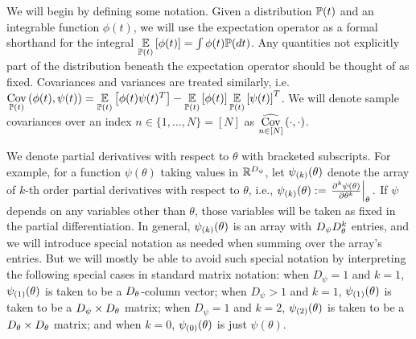 We will begin by defining some notation. Given a distribution $\mathbb{P}(t)$ and an
integrable function $\phi(t)$, we will use the expectation operator as a formal
shorthand for the integral
%
$\underset{\mathbb{P}(t)}{\mathbb{E}}\left[\phi(t)\right] = \int \phi(t) \mathbb{P}(dt)$.
%
Any quantities not explicitly part of the distribution beneath the expectation
operator should be thought of as fixed. Covariances and variances are treated
similarly, i.e.\,
%
%
$\underset{\mathbb{P}(t)}{\mathrm{Cov}}\left(\phi(t), \psi(t)\right) =
    \underset{\mathbb{P}(t)}{\mathbb{E}}\left[\phi(t) \psi(t)^T\right] -
        \underset{\mathbb{P}(t)}{\mathbb{E}}\left[\phi(t)\right] \underset{\mathbb{P}(t)}{\mathbb{E}}\left[\psi(t)\right]^T$.
%
%
We will denote sample covariances over an index $n \in \{1,
\ldots, N \} = [N]$ as $\underset{n \in [N]}{\widehat{\mathrm{Cov}}}\left(\cdot, \cdot\right)$.

We denote partial derivatives with respect to $\theta$ with bracketed
subscripts.  For example, for a function $\psi(\theta)$ taking values in
$\mathbb{R}^{D_\psi}$, let $\psi_{(k)}(\theta)$ denote the array of $k$-th order
partial derivatives with respect to $\theta$, i.e.,
%
%
$
\psi_{(k)}(\theta) :=
    \left.\frac{\partial^k \psi(\theta)}{\partial\theta^k}\right\vert_{\theta}.
$
%
%
If $\psi$ depends on any variables other than $\theta$, those variables will be
taken as fixed in the partial differentiation.
%
In general, $\psi_{(k)}(\theta)$ is an array with $D_\psi D_\theta^k$ entries, and we
will introduce special notation as needed when summing over the array's entries.
But we will mostly be able to avoid such special notation by interpreting the
following special cases in standard matrix notation:
%
%
when $D_\psi = 1$ and $k = 1$, $\psi_{(1)}(\theta)$ is taken to be a
$D_\theta$-column vector; when $D_\psi > 1$ and $k = 1$, $\psi_{(1)}(\theta)$
is taken to be a $D_\psi \times D_\theta$ matrix; when $D_\psi = 1$ and $k=2$,
$\psi_{(2)}(\theta)$ is taken to be a $D_\theta \times D_\theta$ matrix; and
when $k = 0$, $\psi_{(0)}(\theta)$ is just $\psi(\theta)$.


